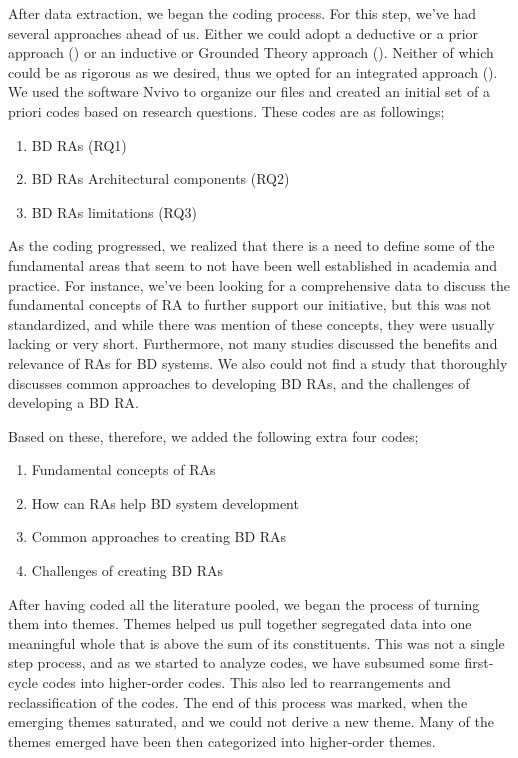\documentclass[review]{elsarticle}
\begin{document}
After data extraction, we began the coding process. For this step, we've had several approaches ahead of us. Either we could adopt a deductive or a prior approach (\cite{miles1994qualitative}) or an inductive or Grounded Theory approach (\cite{corbin2014basics}). Neither of which could be as rigorous as we desired, thus we opted for an integrated approach (\cite{lofland1971analyzing}). We used the software Nvivo to organize our files and created an initial set of a priori codes based on research questions. These codes are as followings;

\begin{enumerate}
    \item BD RAs (RQ1)
    \item BD RAs Architectural components (RQ2)
    \item BD RAs limitations (RQ3)
\end{enumerate}

As the coding progressed, we realized that there is a need to define some of the fundamental areas that seem to not have been well established in academia and practice. For instance, we've been looking for a comprehensive data to discuss the fundamental concepts of RA to further support our initiative, but this was not standardized, and while there was mention of these concepts, they were usually lacking or very short. Furthermore, not many studies discussed the benefits and relevance of RAs for BD systems. We also could not find a study that thoroughly discusses common approaches to developing BD RAs, and the challenges of developing a BD RA.

Based on these, therefore, we added the following extra four codes;
\begin{enumerate}
    \item Fundamental concepts of RAs
    \item How can RAs help BD system development
    \item Common approaches to creating BD RAs
    \item Challenges of creating BD RAs
\end{enumerate}

After having coded all the literature pooled, we began the process of turning them into themes. Themes helped us pull together segregated data into one meaningful whole that is above the sum of its constituents. This was not a single step process, and as we started to analyze codes, we have subsumed some first-cycle codes into higher-order codes. This also led to rearrangements and reclassification of the codes. The end of this process was marked, when the emerging themes saturated, and we could not derive a new theme. Many of the themes emerged have been then categorized into higher-order themes. 
\end{document}
